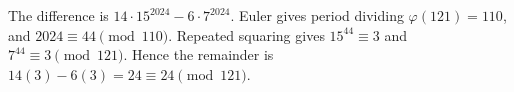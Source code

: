 The difference is $14\cdot15^{2024}-6\cdot7^{2024}$. Euler gives period dividing $\varphi(121)=110$, and $2024\equiv44\pmod{110}$. Repeated squaring gives $15^{44}\equiv3$ and $7^{44}\equiv3\pmod{121}$. Hence the remainder is $14(3)-6(3)=24\equiv\boxed{24}\pmod{121}$.

